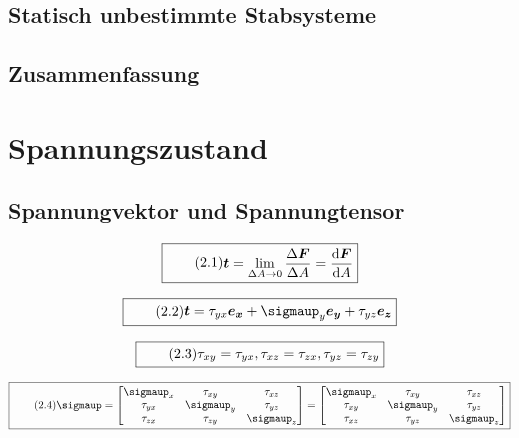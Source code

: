 \documentclass[11pt]{article}
\newcommand{\1}{ {\mathds{1}} }
\renewcommand{\sigma  }{\sigmaup   }
\begin{document}
		\subsection{Statisch unbestimmte Stabsysteme}

		\subsection{Zusammenfassung}
		
		\section{Spannungszustand}
		\subsection{Spannungvektor und Spannungtensor}

		\begin{equation}
			\boxed{
				\tag{2.1}
				\begin{split}
					\boldsymbol{t}
					=
					\lim_{\Delta A \rightarrow 0}
					\frac{\Delta \boldsymbol{F}}{\Delta A}
					=
					\frac{\text{d}\boldsymbol{F}}{\text{d}A}
				\end{split}
			}
		\end{equation}

		\begin{equation}
			\boxed{
				\tag{2.2}
				\begin{split}
					\boldsymbol{t}
					=
					\tau_{yx} \boldsymbol{e_x}
					+
					\sigma_y	\boldsymbol{e_y}
					+
					\tau_{yz} \boldsymbol{e_z}
				\end{split}
			}
		\end{equation}

		\begin{equation}
			\boxed{
				\tag{2.3}
				\begin{split}
					\tau_{xy} = \tau_{yx},
					\tau_{xz} = \tau_{zx},
					\tau_{yz} = \tau_{zy}
				\end{split}
			}
		\end{equation}
		
		\begin{equation}
			\boxed{
				\tag{2.4}
				\begin{split}
					\boldsymbol{\sigma}
					=
					\begin{bmatrix*}
						\sigma_{x} & \tau_{xy}	& \tau_{xz} \\
						\tau_{yx}	& \sigma_{y} & \tau_{yz} \\
						\tau_{zx}	& \tau_{zy}	& \sigma_{z}
					\end{bmatrix*}
					=
					\begin{bmatrix*}
						\sigma_{x} & \tau_{xy}	& \tau_{xz} \\
						\tau_{xy}	& \sigma_{y} & \tau_{yz} \\
						\tau_{xz}	& \tau_{yz}	& \sigma_{z}
					\end{bmatrix*}					
				\end{split}
			}
		\end{equation}
\end{document}
